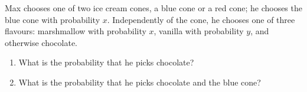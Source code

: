 Max chooses one of two ice cream cones, a blue cone or a red cone; he chooses the blue cone with probability $x$. Independently of the cone, he chooses one of three flavours: marshmallow with probability $x$, vanilla with probability $y$, and otherwise chocolate.
\begin{enumerate}
\item[(a)] What is the probability that he picks chocolate?
\item[(b)] What is the probability that he picks chocolate and the blue cone?
\end{enumerate}
